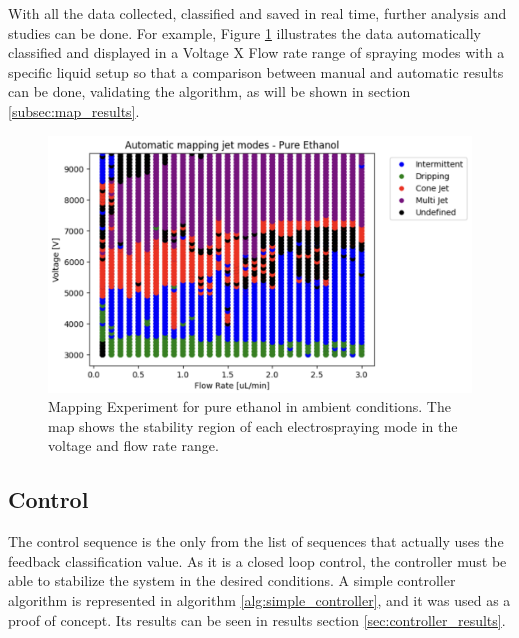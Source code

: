     With all the data collected, classified and saved in real time, further analysis and studies can be done. 
    For example, Figure \ref{fig:map3Data_fig} illustrates the data automatically classified and displayed in a Voltage X Flow rate range of spraying modes with a specific liquid setup so that a comparison between manual and automatic results can be done, validating the algorithm, as will be shown in section \ref{subsec:map_results}.

    \begin{figure}[H]
        \center
        \includegraphics[width=15cm]{Figuras/report4/map-2023-03-02.png}
        \caption{Mapping Experiment for pure ethanol in ambient conditions. The map shows the stability region of each electrospraying mode in the voltage and flow rate range.}
        \label{fig:map3Data_fig}
    \end{figure}



\subsection{Control}

    The control sequence is the only from the list of sequences that actually uses the feedback classification value. 
    As it is a closed loop control, the controller must be able to stabilize the system in the desired conditions.
    A simple controller algorithm is represented in algorithm \ref{alg:simple_controller}, and it was used as a proof of concept.
    Its results can be seen in results section \ref{sec:controller_results}.

